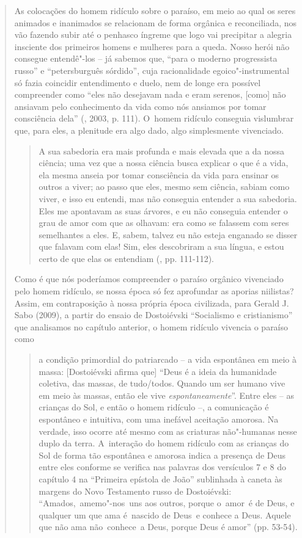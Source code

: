 {\begin{quote}
As colocações do homem ridículo sobre o paraíso, em meio ao qual os
seres animados e inanimados se relacionam de forma orgânica e
reconciliada, nos vão fazendo subir até o penhasco íngreme que logo vai
precipitar a alegria insciente dos primeiros homens e mulheres para a
queda. Nosso herói não consegue entendê"-los -- já sabemos que, ``para o
moderno progressista russo'' e ``petersburguês sórdido'', cuja
racionalidade egoico"-instrumental só fazia coincidir entendimento e
duelo, nem de longe era possível compreender como ``eles não desejavam
nada e eram serenos, {[}como{]} não ansiavam pelo conhecimento da vida
como nós ansiamos por tomar consciência dela'' (, 2003, p.
111). O~homem ridículo conseguia vislumbrar que, para eles, a plenitude
era algo dado, algo simplesmente vivenciado.

\begin{quote}
A sua sabedoria era mais profunda e mais elevada que a da nossa ciência;
uma vez que a nossa ciência busca explicar o que é a vida, ela mesma
anseia por tomar consciência da vida para ensinar os outros a viver; ao
passo que eles, mesmo sem ciência, sabiam como viver, e isso eu entendi,
mas não conseguia entender a sua sabedoria. Eles me apontavam as suas
árvores, e eu não conseguia entender o grau de amor com que as olhavam:
era como se falassem com seres semelhantes a eles. E, sabem, talvez eu
não esteja enganado se disser que falavam com elas! Sim, eles
descobriram a sua língua, e estou certo de que elas os entendiam (,
pp. 111-112).
\end{quote}

Como é que nós poderíamos compreender o paraíso orgânico vivenciado pelo
homem ridículo, se nossa época só fez aprofundar as aporias niilistas?
Assim, em contraposição à nossa própria época civilizada, para Gerald J.
Sabo (2009), a partir do ensaio de Dostoiévski ``Socialismo e
cristianismo'' que analisamos no capítulo anterior, o homem ridículo
vivencia o paraíso como

\begin{quote}
a condição primordial do patriarcado -- a vida espontânea em meio à
massa: {[}Dostoiévski afirma que{]} ``Deus é a ideia da humanidade
coletiva, das massas, de tudo/todos. Quando um ser humano vive em meio
às massas, então ele vive \emph{espontaneamente}''. Entre eles -- as
crianças do Sol, e então o homem ridículo --, a comunicação é espontâneo
e intuitiva, com uma inefável aceitação amorosa. Na verdade, isso ocorre
até mesmo com as criaturas não"-humanas nesse duplo da terra. A~interação
do homem ridículo com as crianças do Sol de forma tão espontânea e
amorosa indica a presença de Deus entre eles conforme se verifica nas
palavras dos versículos 7 e 8 do capítulo 4 na ``Primeira epístola de
João'' sublinhada à caneta às margens do Novo Testamento russo de
Dostoiévski: ``Amados,~amemo"-nos~uns aos outros, porque o~amor~é de
Deus, e qualquer um que ama é~nascido de Deus~e conhece a Deus. Aquele
que não ama não~conhece~a Deus, porque Deus é amor'' (pp. 53-54).
\end{quote}


\end{quote}}
